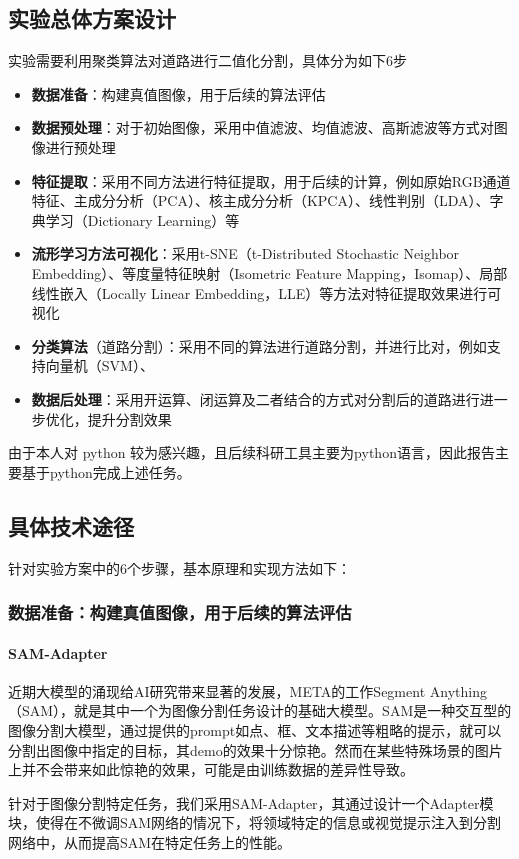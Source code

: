 \documentclass[12pt,hyperref,a4paper,UTF8]{ctexart}
\begin{document}
\subsection{实验总体方案设计}
实验需要利用聚类算法对道路进行二值化分割，具体分为如下6步
\begin{itemize}
    \item \textbf{数据准备}：构建真值图像，用于后续的算法评估
    \item \textbf{数据预处理}：对于初始图像，采用中值滤波、均值滤波、高斯滤波等方式对图像进行预处理
    \item \textbf{特征提取}：采用不同方法进行特征提取，用于后续的计算，例如原始RGB通道特征、主成分分析（PCA）、核主成分分析（KPCA）、线性判别（LDA）、字典学习（Dictionary Learning）等
    \item \textbf{流形学习方法可视化}：采用t-SNE（t-Distributed Stochastic Neighbor Embedding）、等度量特征映射（Isometric Feature Mapping，Isomap）、局部线性嵌入（Locally Linear Embedding，LLE）等方法对特征提取效果进行可视化
    \item \textbf{分类算法}（道路分割）：采用不同的算法进行道路分割，并进行比对，例如支持向量机（SVM）、
    \item \textbf{数据后处理}：采用开运算、闭运算及二者结合的方式对分割后的道路进行进一步优化，提升分割效果

\end{itemize}
由于本人对 python 较为感兴趣，且后续科研工具主要为python语言，因此报告主要基于python完成上述任务。
\subsection{具体技术途径}
针对实验方案中的6个步骤，基本原理和实现方法如下：
\subsubsection{数据准备：构建真值图像，用于后续的算法评估}
\paragraph{SAM-Adapter}
近期大模型的涌现给AI研究带来显著的发展，META的工作Segment Anything（SAM），就是其中一个为图像分割任务设计的基础大模型。SAM是一种交互型的图像分割大模型，通过提供的prompt如点、框、文本描述等粗略的提示，就可以分割出图像中指定的目标，其demo的效果十分惊艳。然而在某些特殊场景的图片上并不会带来如此惊艳的效果，可能是由训练数据的差异性导致。
\par
针对于图像分割特定任务，我们采用SAM-Adapter，其通过设计一个Adapter模块，使得在不微调SAM网络的情况下，将领域特定的信息或视觉提示注入到分割网络中，从而提高SAM在特定任务上的性能。
\par
\end{document}
